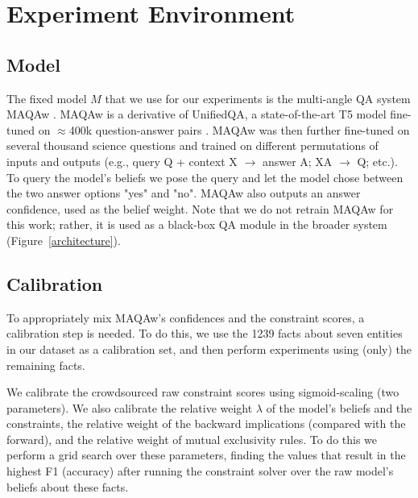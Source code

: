 \documentclass[11pt]{article}
\newcommand{\nk}[1]{\textcolor{green}{Nora: #1}}
\newcommand{\eat}[1]{}
\begin{document}
\section{Experiment Environment}

\subsection{Model}

The fixed model $M$ that we use for our experiments is the multi-angle QA system MAQAw \cite{arc-da}.
MAQAw is a derivative of UnifiedQA, a state-of-the-art T5 model fine-tuned on $\approx$400k question-answer pairs
\cite{unifiedqa}. MAQAw was then 
further fine-tuned on several thousand science questions and trained on different permutations of inputs and outputs
(e.g., query Q + context X $\rightarrow$ answer A; XA $\rightarrow$ Q; etc.). 
To query the model's beliefs we pose the query and let the model chose between the two answer options "yes" and "no".
MAQAw also outputs an answer confidence, used as the belief weight. Note that we do not retrain MAQAw for
this work; rather, it is used as a black-box QA module in the broader system (Figure~\ref{architecture}).



\subsection{Calibration \label{calibration}}

To appropriately mix MAQAw's confidences and the constraint scores, a calibration step is needed. To do this,
we use the 1239 facts about seven entities in our dataset as a calibration set, and then perform
experiments using (only) the remaining facts. 

We calibrate the crowdsourced raw constraint scores using sigmoid-scaling (two parameters).
We also calibrate the relative weight $\lambda$ of the model's beliefs and the constraints,
the relative weight of the backward implications (compared with the forward), and 
the relative weight of mutual exclusivity rules.
To do this we perform a grid search over these parameters, finding the values that result in
the highest F1 (accuracy) after running the constraint solver over the raw model's beliefs about
these facts.

\eat{
Using the calibration facts, we perform a grid search 
\subsection{Calibration}
For constraint solving constraint and belief
weights have to be well calibrated. We use a small set of seven entities and their grounded test set for calibration and maximize F1.

The crowdsourced raw constraint scores were calibrated by sigmoid-scaling, using a
grid search over slope and shift to identify the scaling hyper-parameters. We also calibrate the relative weight of the model's beliefs and the constraints, and the relative weight of the forward, backwards and mututal exclusivities. \nk{Should I put more details in the Appendix?}
}
\end{document}
